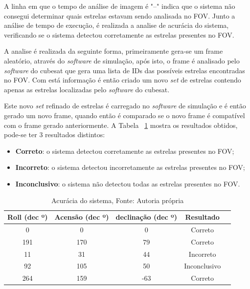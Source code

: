 A linha em que o tempo de análise de imagem é "--" indica que o sistema não consegui determinar quais estrelas estavam sendo analisada no FOV. 
Junto a análise de tempo de execução, é realizada a analise de acurácia do sistema,
verificando se o sistema detectou corretamente as estrelas presentes no FOV.

A analise é realizada da seguinte forma, primeiramente gera-se um frame aleatório, através do \textit{software} de simulação,
após isto, o frame é analisado pelo \textit{software} do cubesat que gera uma lista de IDs das possíveis estrelas encontradas no FOV.
Com está informação é então criado um novo \textit{set} de estrelas contendo apenas as estrelas localizadas pelo \textit{software} do cubesat.

Este novo \textit{set} refinado de estrelas é carregado no \textit{software} de simulação e é então gerado um novo frame, quando então é comparado se o novo frame é compatível com o frame gerado anteriormente. 
A Tabela ~\ref{tab:acuracia} mostra os resultados obtidos, 
pode-se ter 3 resultados distintos:

\begin{itemize}
    \item \textbf{Correto}: o sistema detectou corretamente as estrelas presentes no FOV;
    \item \textbf{Incorreto}: o sistema detectou incorretamente as estrelas presentes no FOV;
    \item \textbf{Inconclusivo}: o sistema não detectou todas as estrelas presentes no FOV.
\end{itemize}

\begin{table}[ht]
    \centering

    \begin{tabular}{|c|c|c|c|c|}
        \hline
        \textbf{Roll (dec º)} & \textbf{Acensão (dec º)} & \textbf{declinação (dec º)} & \textbf{Resultado} \\ \hline
        0                     & 0                        & 0                           & Correto            \\ \hline
        191                   & 170                      & 79                          & Correto            \\ \hline
        11                    & 31                       & 44                          & Incorreto          \\ \hline
        92                    & 105                      & 50                          & Inconclusivo       \\ \hline
        264                   & 159                      & -63                         & Correto            \\ \hline
    \end{tabular}
    \caption{Acurácia do sistema, Fonte: Autoria própria}
    \label{tab:acuracia}
\end{table}

